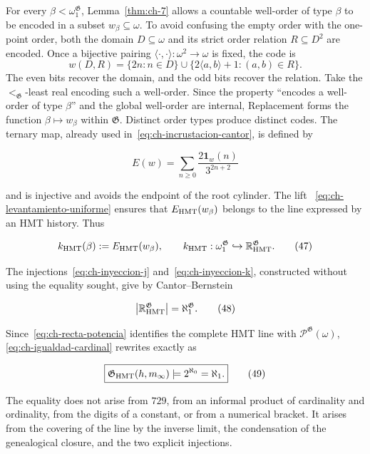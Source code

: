 For every \(\beta<\omega_1^{\mathfrak G}\), Lemma~\ref{thm:ch-7} allows a
countable well-order of type \(\beta\) to be encoded in a subset
\(w_\beta\subseteq\omega\). To avoid confusing the empty order with the
one-point order, both the domain \(D\subseteq\omega\) and its strict order
relation \(R\subseteq D^2\) are encoded. Once a bijective pairing
\(\langle\cdot,\cdot\rangle:\omega^2\to\omega\) is fixed, the code is
\[
 w(D,R)=\{2n:n\in D\}\cup
        \{2\langle a,b\rangle+1:(a,b)\in R\}.
\]
The even bits recover the domain, and the odd bits recover the relation. Take
the \(<_{\mathfrak G}\)-least real encoding such a well-order. Since the
property “encodes a well-order of type \(\beta\)” and the global well-order are
internal, Replacement forms the function \(\beta\mapsto w_\beta\) within
\(\mathfrak G\). Distinct order types produce distinct codes. The ternary map,
already used in~\eqref{eq:ch-incrustacion-cantor}, is defined by

\[
 E(w)=\sum_{n\ge0}\frac{2\mathbf1_w(n)}{3^{2n+2}}
\tag{46}\label{eq:ch-incrustacion-ternaria}
\]

and is injective and avoids the endpoint of the root cylinder. The lift
~\eqref{eq:ch-levantamiento-uniforme} ensures that
\(E_{\rm HMT}(w_\beta)\) belongs to the line expressed by an HMT history. Thus

\[
 k_{\rm HMT}(\beta):=E_{\rm HMT}(w_\beta),
 \qquad
 k_{\rm HMT}:\omega_1^{\mathfrak G}
 \hookrightarrow\mathbb R_{\rm HMT}^{\mathfrak G}.
\tag{47}\label{eq:ch-inyeccion-k}
\]

The injections~\eqref{eq:ch-inyeccion-j} and~\eqref{eq:ch-inyeccion-k},
constructed without using the equality sought, give by Cantor--Bernstein

\[
 \bigl|\mathbb R_{\rm HMT}^{\mathfrak G}\bigr|
 =\aleph_1^{\mathfrak G}.
\tag{48}\label{eq:ch-igualdad-cardinal}
\]

Since~\eqref{eq:ch-recta-potencia} identifies the complete HMT line with
\(\mathcal P^{\mathfrak G}(\omega)\), \eqref{eq:ch-igualdad-cardinal} rewrites
exactly as

\[
 \boxed{
  \mathfrak G_{\rm HMT}(h,m_\infty)
  \models 2^{\aleph_0}=\aleph_1.}
\tag{49}\label{eq:ch-decision}
\]

The equality does not arise from \(729\), from an informal product of
cardinality and ordinality, from the digits of a constant, or from a numerical
bracket. It arises from the covering of the line by the inverse limit, the
condensation of the genealogical closure, and the two explicit injections.

